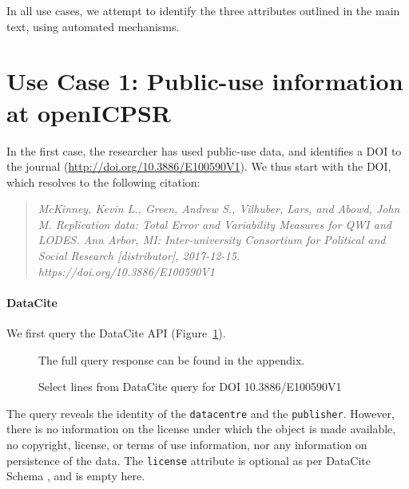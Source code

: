 In all use cases, we attempt to identify the three attributes outlined in the main text, using automated mechanisms.

\section{Use Case 1: Public-use information at openICPSR}
In the first case, the researcher has  used public-use data, and identifies a \ac{DOI} to the journal (\url{http://doi.org/10.3886/E100590V1}).  We thus start with the \ac{DOI}, which resolves to the following citation:

\begin{quote}
	\it
	McKinney, Kevin L., Green, Andrew S., Vilhuber, Lars, and Abowd, John M. Replication data: Total Error and Variability Measures for QWI and LODES. Ann Arbor, MI: Inter-university Consortium for Political and Social Research [distributor], 2017-12-15. https://doi.org/10.3886/E100590V1
\end{quote}

\FloatBarrier
\paragraph{DataCite}

We first query the DataCite API (Figure~\ref{fig:case1:datacite}).
\begin{figure}
	\singlespacing
	
	
	
	
	
	
	\caption{Select lines from DataCite query for DOI 10.3886/E100590V1}
	\label{fig:case1:datacite}
	\centering \footnotesize The full query response can be found in the appendix.
\end{figure}
%
The query reveals the identity of the \texttt{datacentre} and the \texttt{publisher}. However, there is no information on the license under which the object is made available, no copyright, license, or terms of use information, nor any information on persistence of the data. The \texttt{license} attribute is optional as per DataCite Schema \parencite{DataCiteMetadataWorkingGroupDataCiteMetadataSchema2017}, and is empty here.

